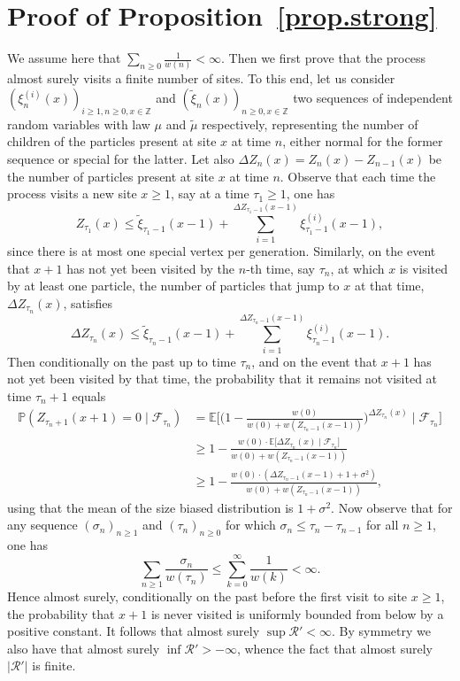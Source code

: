 \documentclass[11pt]{article}
\newcommand{\1}{{\text{\Large $\mathfrak 1$}}}
\begin{document}


\section{Proof of Proposition~\ref{prop.strong}}\label{sec:propstrong}
We assume here that $\sum_{n\ge 0} \frac 1{w(n)}<\infty$. Then we first prove that the process almost surely visits a finite number of sites. To this end, let us consider $(\xi^{(i)}_n(x))_{i\ge 1, n\ge 0, x\in \mathbb Z}$ and 
$(\widetilde \xi_n(x))_{n\ge 0,x\in \mathbb Z}$  two sequences of independent random variables with law $\mu$ and $\widetilde \mu$ respectively, representing the number of children of the particles present at site $x$ at time $n$, either normal for the former sequence or special for the latter. Let also $\Delta Z_n(x) = Z_n(x) - Z_{n-1}(x)$ be the number of particles present at site $x$ at time $n$. 
Observe that each time the process visits a new site $x\ge 1$, say at a time $\tau_1\ge 1$, one has 
$$Z_{\tau_1}(x) \le \widetilde \xi_{\tau_1-1}(x-1) + \sum_{i=1}^{\Delta Z_{\tau_1-1}(x-1)} \xi^{(i)}_{\tau_1-1}(x-1),$$
since there is at most one special vertex per generation.  
Similarly, on the event that $x+1$ has not yet been visited by the $n$-th time, say $\tau_n$, at which $x$ is visited by at least one particle, the number of particles that jump to $x$ at that time, $\Delta Z_{\tau_n}(x)$, satisfies 
$$\Delta Z_{\tau_n}(x) \le \widetilde \xi_{\tau_n-1}(x-1) + \sum_{i=1}^{\Delta Z_{\tau_n - 1}(x-1)} \xi^{(i)}_{\tau_n-1}(x-1). $$ 
Then conditionally on the past up to time $\tau_n$, and on the event that $x+1$ has not yet been visited by that time, the probability that it remains not visited at time $\tau_n+1$ equals 
\begin{align*}
\mathbb P(Z_{\tau_n +1}(x+1) = 0\mid \mathcal F_{\tau_n})&  = \mathbb E\Big[\Big(1- \frac{w(0)}{w(0) + w(Z_{\tau_n-1}(x-1))}\Big)^{\Delta Z_{\tau_n}(x)} \mid \mathcal F_{\tau_n}\Big] \\
& \ge  1 - \frac{w(0)\cdot \mathbb E\Big[\Delta Z_{\tau_n}(x) \mid \mathcal F_{\tau_n}\Big]}{w(0) + w(Z_{\tau_n-1}(x-1))}\\ 
& \ge  1 - \frac{w(0)\cdot (\Delta Z_{\tau_n-1}(x-1)+ 1+\sigma^2) }{w(0) + w(Z_{\tau_n-1}(x-1))},
\end{align*}
using that the mean of the size biased distribution is $1+\sigma^2$. Now observe that for any sequence $(\sigma_n)_{n\ge 1}$ and $(\tau_n)_{n\ge 0}$ for which $\sigma_n \le \tau_n - \tau_{n-1}$ for all $n\ge 1$, one has 
$$\sum_{n\ge 1} \frac{\sigma_n}{w(\tau_n)} \le \sum_{k=0}^\infty \frac 1{w(k)}<\infty. $$ 
Hence almost surely, conditionally on the past before the first visit to site $x\ge 1$, the probability that $x+1$ is never visited is uniformly bounded from below by a positive constant. It follows that almost surely $\sup \mathcal R'<\infty$. By symmetry we also have that almost surely $\inf \mathcal R'>-\infty$, whence the fact that almost surely $|\mathcal R'|$ is finite. 
\end{document}
